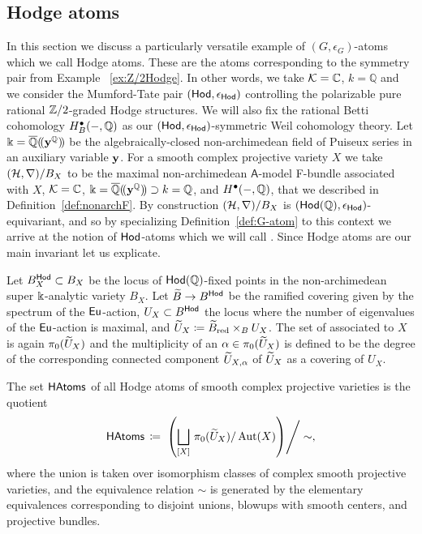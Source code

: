 \documentclass[twoside,leqno]{article}
\numberwithin{equation}{section}
\theoremstyle{plain}
\theoremstyle{definition}
\begin{document}
\medskip

\subsection{Hodge atoms} \label{sec:Hodge_atoms}


In this section we discuss a particularly versatile example of $(G,\epsilon_{G})$-atoms which we call Hodge atoms. These are the atoms corresponding to the symmetry pair from Example ~\ref{ex:Z/2Hodge}. In other words, we take $\mathcal K = \mathbb C$, $k = \mathbb{Q}$ and we consider the Mumford-Tate pair $(\mathsf{Hod},\epsilon_{\mathsf{Hod}})$  controlling the polarizable pure rational $\mathbb Z/2$-graded Hodge structures. We will also fix the rational Betti cohomology $H^{\bullet}_{B}(-,\mathbb Q)$ as our $(\mathsf{Hod},\epsilon_{\mathsf{Hod}})$-symmetric Weil cohomology theory. Let $\Bbbk = \overline{\mathbb Q}(\!(\mathbf{y}^{\mathbb Q})\!)$ be the algebraically-closed non-archimedean field of Puiseux series in an auxiliary variable $\mathbf{y}$. For a smooth complex projective variety $X$ we take $(\mathcal H,\nabla)/B_{X}$ to be the maximal non-archimedean $\mathsf{A}$-model F-bundle associated with $X$, $\mathcal K = \mathbb C$, $\Bbbk = \overline{\mathbb Q}(\!(\mathbf{y}^{\mathbb Q})\!) \supset k = \mathbb Q$, and $H^{\bullet}(-,\mathbb Q)$, that we described in Definition~\ref{def:nonarchF}. By construction 
$(\mathcal H,\nabla)/B_{X}$ is $(\mathsf{Hod}(\mathbb Q),\epsilon_{\mathsf{Hod}})$-equivariant, and so by specializing Definition~\ref{def:G-atom} to this context we arrive at the notion of  $\mathsf{Hod}$-atoms which we will call . Since Hodge atoms are our main invariant let us explicate.

Let $B^{\mathsf{Hod}}_{X} \subset B_{X}$ be the locus of $\mathsf{Hod}(\mathbb Q)$-fixed points in the non-archimedean super $\Bbbk$-analytic variety $B_{X}$.
Let $\widetilde{B} \to B^{\mathsf{Hod}}$ be the ramified covering given by the spectrum of the $\operatorname{\mathsf{Eu}}$-action, $U_X \subset B^{\mathsf{Hod}}$ the locus where the number of eigenvalues of the $\operatorname{\mathsf{Eu}}$-action is maximal, and \linebreak $\widetilde U_X \coloneqq \widetilde{B}_{\operatorname{red}} \times_B U_X$.
The set of  associated to $X$ is again  $\pi_{0}(\widetilde U_{X})$ and the  multiplicity of an $\alpha \in \pi_{0}(\widetilde U_{X})$ is defined to be the degree of the corresponding connected component 
$\widetilde U_{X,\alpha}$ of $\widetilde U_{X}$ as a covering of $U_{X}$. 


The set $\mathsf{HAtoms}$ of all Hodge atoms of smooth complex projective varieties
is the quotient 
\[
\mathsf{HAtoms} \, \coloneqq \, \left.\left( \bigsqcup_{[X]} \, \pi_{0}(\widetilde U_{X})/\operatorname{Aut}(X)\right)\right/\sim, 
\] 
where the union is taken over isomorphism classes of complex smooth projective varieties, and the equivalence relation $\sim$ is generated by the elementary equivalences corresponding to 
disjoint unions, blowups with smooth centers, and projective bundles.
\end{document}
